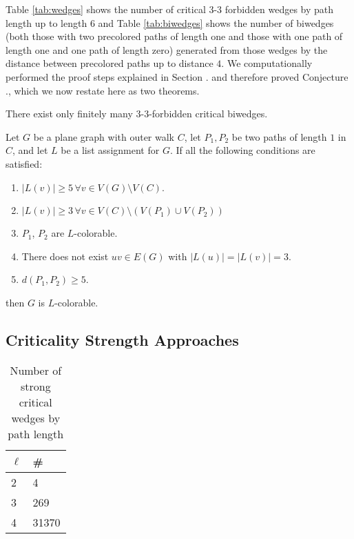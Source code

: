 Table \ref{tab:wedges} shows the number of critical 3-3 forbidden wedges by path length up to
length $6$ and Table \ref{tab:biwedges} shows the number of biwedges (both those with two precolored
paths of length one and those with one path of length one and one path of length zero) generated
from those wedges by the distance between precolored paths up to distance $4$. We computationally performed the proof steps explained in Section . and therefore proved Conjecture ., which
we now restate here as two theorems. 


\begin{theorem}
There exist only finitely many 3-3-forbidden critical biwedges.
\end{theorem}

\begin{theorem}
Let $G$ be a plane graph with outer walk $C$, let $P_1, P_2$ be two paths of length $1$ in $C$, and let
$L$ be a list assignment for $G$. If all the following conditions are satisfied:

\begin{enumerate}
	\item $|L(v)| \geq 5 \, \forall v \in V(G) \setminus V(C)$.
	\item $|L(v)| \geq 3 \, \forall v \in V(C) \setminus (V(P_1) \cup V(P_2))$
	\item $P_1$, $P_2$ are $L$-colorable.
	\item There does not exist $uv \in E(G)$ with $|L(u)| = |L(v)| = 3$.
	\item $d(P_1, P_2) \geq 5$.
\end{enumerate}

then $G$ is $L$-colorable. 
\end{theorem}




\subsection{Criticality Strength Approaches}

\begin{table}[h]
\label{tab:strongwedges}
\centering
\begin{tabular}{l | l}
$\ell$ & \# \\
\hline
2 & 4 \\
3 & 269\\ 
4 & 31370 \\
\end{tabular}
\caption{Number of strong critical wedges by path length}
\end{table}

